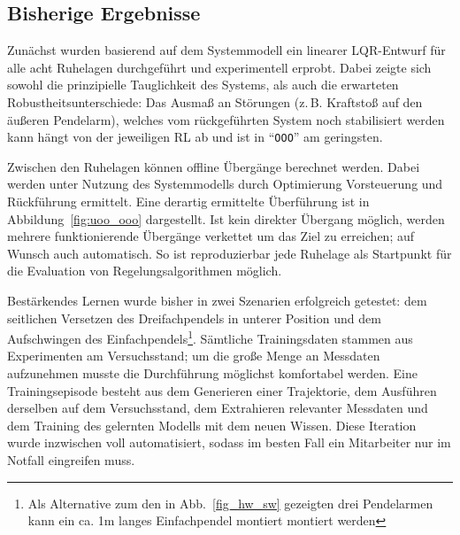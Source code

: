 \documentclass[a4paper,10pt]{scrartcl}
\newcommand{\figref}[1]{Abb.~\ref{#1}}
\begin{document}
\subsection{Bisherige Ergebnisse}

Zunächst wurden basierend auf dem Systemmodell ein linearer LQR-Entwurf für alle acht Ruhelagen durchgeführt und experimentell erprobt. Dabei zeigte sich sowohl die prinzipielle Tauglichkeit des Systems, als auch die erwarteten Robustheitsunterschiede: Das Ausmaß an Störungen (z.\,B. Kraftstoß auf den äußeren Pendelarm), welches vom rückgeführten System noch stabilisiert werden kann hängt von der jeweiligen RL ab und ist in "`\texttt{OOO}"' am geringsten.
    
\medskip
    
Zwischen den Ruhelagen können offline Übergänge berechnet werden. Dabei werden unter Nutzung des Systemmodells durch Optimierung Vorsteuerung und Rückführung ermittelt.
Eine derartig ermittelte Überführung ist in Abbildung~\ref{fig:uoo_ooo} dargestellt.
Ist kein direkter Übergang möglich, werden mehrere funktionierende Übergänge verkettet um das Ziel zu erreichen; auf Wunsch auch automatisch. So ist reproduzierbar jede Ruhelage als Startpunkt für die Evaluation von Regelungsalgorithmen möglich.

\medskip
Bestärkendes Lernen wurde bisher in zwei Szenarien erfolgreich getestet: dem seitlichen Versetzen des Dreifachpendels in unterer Position und dem Aufschwingen des Einfachpendels\footnote{Als Alternative zum den in \figref{fig_hw_sw} gezeigten drei Pendelarmen kann ein ca. 1m langes Einfachpendel montiert montiert werden}. Sämtliche Trainingsdaten stammen aus Experimenten am Versuchsstand; um die große Menge an Messdaten aufzunehmen musste die Durchführung möglichst komfortabel werden. Eine Trainingsepisode besteht aus dem Generieren einer Trajektorie, dem Ausführen derselben auf dem Versuchsstand, dem Extrahieren relevanter Messdaten und dem Training des gelernten Modells mit dem neuen Wissen. Diese Iteration wurde inzwischen voll automatisiert, sodass im besten Fall ein Mitarbeiter nur im Notfall eingreifen muss.
\end{document}
